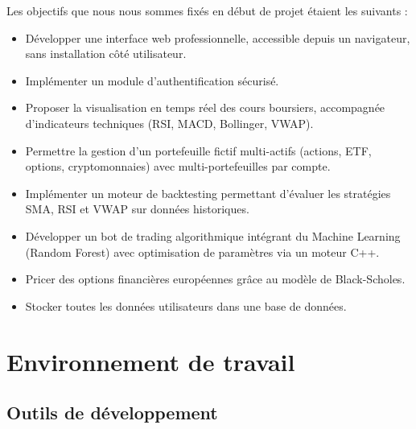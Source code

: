 \documentclass[a4paper, 12pt, twoside]{article}
\begin{document}
Les objectifs que nous nous sommes fixés en début de projet étaient les
suivants :

\begin{itemize}
    \item Développer une interface web professionnelle, accessible depuis
          un navigateur, sans installation côté utilisateur.
    \item Implémenter un module d'authentification sécurisé.
    \item Proposer la visualisation en temps réel des cours boursiers,
          accompagnée d'indicateurs techniques (RSI, MACD, Bollinger, VWAP).
    \item Permettre la gestion d'un portefeuille fictif multi-actifs
          (actions, ETF, options, cryptomonnaies) avec multi-portefeuilles
          par compte.
    \item Implémenter un moteur de backtesting permettant d'évaluer les
          stratégies SMA, RSI et VWAP sur données historiques.
    \item Développer un bot de trading algorithmique intégrant du Machine
          Learning (Random Forest) avec optimisation de paramètres via un
          moteur C++.
    \item Pricer des options financières européennes grâce au modèle de
          Black-Scholes.
    \item Stocker toutes les données utilisateurs dans une base de données.
\end{itemize}

\section{Environnement de travail}

\subsection{Outils de développement}
\end{document}
